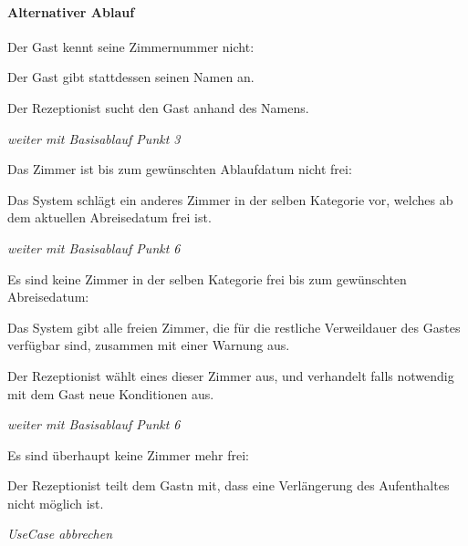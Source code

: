 \paragraph{Alternativer Ablauf}
\begin{longenum}
	\item
	\begin{longenum}
		\item Der \Gls{Gast} kennt seine Zimmernummer nicht:
		\begin{longenum}
			\item Der \Gls{Gast} gibt stattdessen seinen Namen an.
			\item Der \Gls{Rezeptionist} sucht den Gast anhand des Namens.
			\item \emph{weiter mit Basisablauf Punkt 3}
		\end{longenum}
	\end{longenum}
	
	\item
	\item
	\item
	\begin{longenum}
		\item Das \Gls{Zimmer} ist bis zum gewünschten Ablaufdatum nicht frei:
		\begin{longenum}
			\item Das System schlägt ein anderes \Gls{Zimmer} in der selben Kategorie vor, welches ab dem aktuellen Abreisedatum frei ist.
			\item \emph{weiter mit Basisablauf Punkt 6}
		\end{longenum}
		
		\item Es sind keine \Gls{Zimmer} in der selben Kategorie frei bis zum gewünschten Abreisedatum:
		\begin{longenum}
			\item Das System gibt alle freien \Gls{Zimmer}, die für die restliche Verweildauer des \Gls{Gast}es verfügbar sind, zusammen mit einer Warnung aus.
			\item Der \Gls{Rezeptionist} wählt eines dieser Zimmer aus, und verhandelt falls notwendig mit dem \Gls{Gast} neue Konditionen aus.
			\item \emph{weiter mit Basisablauf Punkt 6}
		\end{longenum}
		
		\item Es sind überhaupt keine \Gls{Zimmer} mehr frei:
		\begin{longenum}
			\item Der \Gls{Rezeptionist} teilt dem \Gls{Gast}n mit, dass eine Verlängerung des Aufenthaltes nicht möglich ist.
			\item \emph{UseCase abbrechen}
		\end{longenum}
	\end{longenum}
	
	\item
	\item
\end{longenum}

